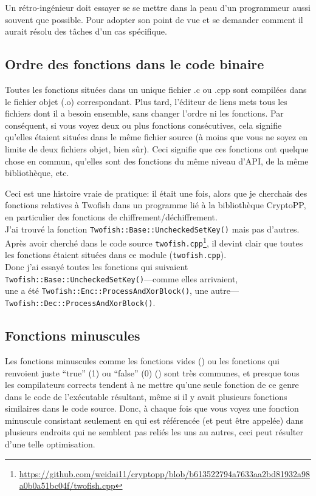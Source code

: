 Un rétro-ingénieur doit essayer se se mettre dans la peau d'un programmeur aussi
souvent que possible.
Pour adopter son point de vue et se demander comment il aurait résolu des tâches
d'un cas spécifique.

\subsection{Ordre des fonctions dans le code binaire}

Toutes les fonctions situées dans un unique fichier .c ou .cpp sont compilées dans
le fichier objet (.o) correspondant.
Plus tard, l'éditeur de liens mets tous les fichiers dont il a besoin ensemble, sans
changer l'ordre ni les fonctions.
Par conséquent, si vous voyez deux ou plus fonctions consécutives, cela signifie
qu'elles étaient situées dans le même fichier source (à moins que vous ne soyez en
limite de deux fichiers objet, bien sûr).
Ceci signifie que ces fonctions ont quelque chose en commun, qu'elles sont des fonctions
du même niveau d'\ac{API}, de la même bibliothèque, etc.

Ceci est une histoire vraie de pratique: il était une fois, alors que je cherchais
des fonctions relatives à Twofish dans un programme lié à la bibliothèque CryptoPP,
en particulier des fonctions de chiffrement/déchiffrement.\\
J'ai trouvé la fonction \verb|Twofish::Base::UncheckedSetKey()| mais pas d'autres.
Après avoir cherché dans le code source
\verb|twofish.cpp|\footnote{\url{https://github.com/weidai11/cryptopp/blob/b613522794a7633aa2bd81932a98a0b0a51bc04f/twofish.cpp}},
il devint clair que toutes les fonctions étaient situées dans ce module (\verb|twofish.cpp|).\\
Donc j'ai essayé toutes les fonctions qui suivaient \verb|Twofish::Base::UncheckedSetKey()|---comme elles arrivaient,\\
une a été \verb|Twofish::Enc::ProcessAndXorBlock()|, une autre---\verb|Twofish::Dec::ProcessAndXorBlock()|.

\subsection{Fonctions minuscules}

Les fonctions minuscules comme les fonctions vides ()
ou les fonctions qui renvoient juste ``true'' (1) ou ``false'' (0) ()
sont très communes, et presque tous les compilateurs corrects tendent à ne mettre
qu'une seule fonction de ce genre dans le code de l'exécutable résultant, même si
il y avait plusieurs fonctions similaires dans le code source.
Donc, à chaque fois que vous voyez une fonction minuscule consistant seulement en
 qui est référencée (et peut être appelée) dans plusieurs endroits
qui ne semblent pas reliés les uns au autres, ceci peut résulter d'une telle optimisation.%

